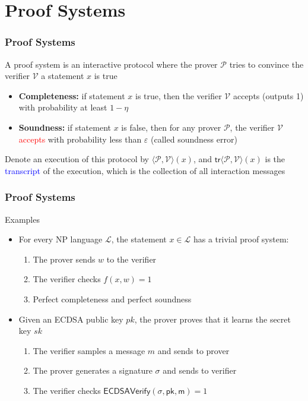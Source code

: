 \documentclass{beamer}
\newcommand{\blue}[1]{\textcolor{blue}{#1}}
\newcommand{\dgreen}[1]{\textcolor{dgreen}{#1}}
\newcommand{\red}[1]{\textcolor{red}{#1}}
\begin{document}
\section{Proof Systems}
\frame
{
  \frametitle{Proof Systems}
  \onslide<+-> A proof system is an interactive protocol where the prover $\mathcal{P}$ tries to convince the verifier $\mathcal{V}$ a statement $x$ is true
  \begin{itemize}
    \item<+-> \textbf{Completeness:} if statement $x$ is true, then the verifier $\mathcal{V}$ \dgreen{accepts} (outputs 1) with probability at least $1-\eta$
    \item<+-> \textbf{Soundness:} if statement $x$ is false, then for any prover $\mathcal{P}$, the verifier $\mathcal{V}$ \red{accepts} with probability less than $\varepsilon$ (called soundness error)
  \end{itemize}
  \onslide<+-> Denote an execution of this protocol by $\langle\mathcal{P},\mathcal{V}\rangle(x)$, and $\mathsf{tr}\langle\mathcal{P},\mathcal{V}\rangle(x)$ is the \blue{transcript} of the execution, which is the collection of all interaction messages
}

\frame
{
  \frametitle{Proof Systems}
  \onslide<+-> Examples
  \begin{itemize}
    \item<+-> For every NP language $\mathcal{L}$, the statement $x\in\mathcal{L}$ has a trivial proof system:
    \begin{enumerate}
      \item<+-> The prover sends $w$ to the verifier
      \item<+-> The verifier checks $f(x,w)=1$
      \item<+-> \dgreen{Perfect completeness} and \dgreen{perfect soundness}
    \end{enumerate}
    \item<+-> Given an ECDSA public key $pk$, the prover proves that it learns the secret key $sk$
    \begin{enumerate}
      \item<+-> The verifier samples a message $m$ and sends to prover
      \item<+-> The prover generates a signature $\sigma$ and sends to verifier
      \item<+-> The verifier checks $\mathsf{ECDSAVerify(\sigma,pk,m)}=1$
    \end{enumerate}
  \end{itemize}
}
\end{document}
